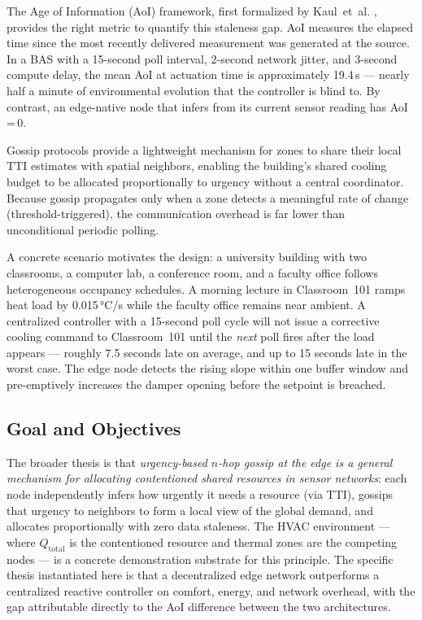 \documentclass[conference]{IEEEtran}
\begin{document}
The Age of Information (AoI) framework, first formalized by Kaul~et~al.
\cite{kaul2012}, provides the right metric to quantify this staleness gap.
AoI measures the elapsed time since the most recently delivered measurement
was generated at the source.  In a BAS with a 15-second poll interval,
2-second network jitter, and 3-second compute delay, the mean AoI at actuation
time is approximately 19.4\,s --- nearly half a minute of environmental
evolution that the controller is blind to.  By contrast, an edge-native node
that infers from its current sensor reading has AoI\,=\,0.

Gossip protocols \cite{kempe2003, boyd2006} provide a lightweight mechanism
for zones to share their local TTI estimates with spatial neighbors, enabling
the building's shared cooling budget to be allocated proportionally to urgency
without a central coordinator.  Because gossip propagates only when a zone
detects a meaningful rate of change (threshold-triggered), the communication
overhead is far lower than unconditional periodic polling.

A concrete scenario motivates the design: a university building with two
classrooms, a computer lab, a conference room, and a faculty office follows
heterogeneous occupancy schedules.  A morning lecture in Classroom~101 ramps
heat load by 0.015\,°C/s while the faculty office remains near ambient.  A
centralized controller with a 15-second poll cycle will not issue a corrective
cooling command to Classroom~101 until the \emph{next} poll fires after the
load appears --- roughly 7.5 seconds late on average, and up to 15 seconds
late in the worst case.  The edge node detects the rising slope within one
buffer window and pre-emptively increases the damper opening before the
setpoint is breached.

\subsection{Goal and Objectives}

The broader thesis is that \emph{urgency-based $n$-hop gossip at the edge
is a general mechanism for allocating contentioned shared resources in
sensor networks}: each node independently infers how urgently it needs a
resource (via TTI), gossips that urgency to neighbors to form a local view
of the global demand, and allocates proportionally with zero data staleness.
The HVAC environment --- where $Q_{\text{total}}$ is the contentioned resource
and thermal zones are the competing nodes --- is a concrete demonstration
substrate for this principle.  The specific thesis instantiated here is that
a decentralized edge network outperforms a centralized reactive controller on
comfort, energy, and network overhead, with the gap attributable directly to
the AoI difference between the two architectures.
\end{document}
